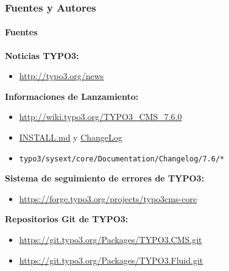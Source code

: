 \begin{frame}[fragile]
	\frametitle{Fuentes y Autores}
	\framesubtitle{Fuentes}

	\textbf{Noticias TYPO3:}
		\begin{itemize}\smaller
			\item \url{http://typo3.org/news}
		\end{itemize}

	\textbf{Informaciones de Lanzamiento:}
		\begin{itemize}\smaller
			\item \url{http://wiki.typo3.org/TYPO3_CMS_7.6.0}
			\item \href{https://github.com/TYPO3/TYPO3.CMS/blob/master/INSTALL.md}{INSTALL.md} y \href{https://github.com/TYPO3/TYPO3.CMS/blob/master/ChangeLog}{ChangeLog}
			\item \texttt{typo3/sysext/core/Documentation/Changelog/7.6/*}
		\end{itemize}

	\textbf{Sistema de seguimiento de errores de TYPO3:}
		\begin{itemize}\smaller
			\item \url{https://forge.typo3.org/projects/typo3cms-core}
		\end{itemize}

	\textbf{Repositorios Git de TYPO3:}
		\begin{itemize}\smaller
			\item \url{https://git.typo3.org/Packages/TYPO3.CMS.git}
			\item \url{https://git.typo3.org/Packages/TYPO3.Fluid.git}
		\end{itemize}

\end{frame}


